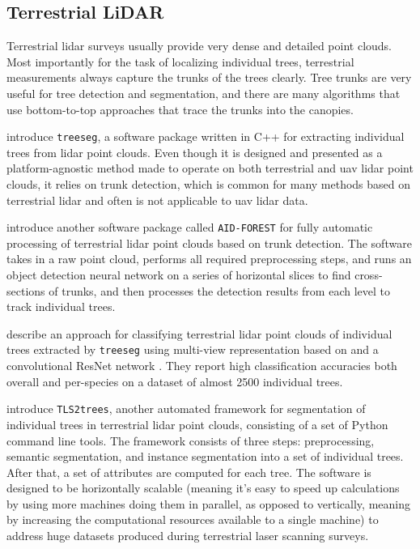 \subsection{Terrestrial LiDAR}

Terrestrial \gls{lidar} surveys usually provide very dense and detailed point clouds.
Most importantly for the task of localizing individual trees, terrestrial measurements always capture the trunks of the trees clearly.
Tree trunks are very useful for tree detection and segmentation, and there are many algorithms that use bottom-to-top approaches that trace the trunks into the canopies.

\citet{burtExtractingIndividualTrees2018} introduce \texttt{treeseg}, a software package written in C++ for extracting individual trees from \gls{lidar} point clouds.
Even though it is designed and presented as a platform-agnostic method made to operate on both terrestrial and \gls{uav} \gls{lidar} point clouds, it relies on trunk detection, which is common for many methods based on terrestrial \gls{lidar} and often is not applicable to \gls{uav} \gls{lidar} data.

\citet{lopezserranoArtificialIntelligencebasedSoftware2022} introduce another software package called \texttt{AID-FOREST} for fully automatic processing of terrestrial \gls{lidar} point clouds based on trunk detection.
The software takes in a raw point cloud, performs all required preprocessing steps, and runs an object detection neural network on a series of horizontal slices to find cross-sections of trunks, and then processes the detection results from each level to track individual trees.

\citet{allenTreeSpeciesClassification2022} describe an approach for classifying terrestrial \gls{lidar} point clouds of individual trees extracted by \texttt{treeseg} using multi-view representation based on \citet{goyalRevisitingPointCloud2021} and a convolutional ResNet network \citep{heDeepResidualLearning2016}.
They report high classification accuracies both overall and per-species on a dataset of almost 2500 individual trees.

\citet{wilkesTLS2treesScalableTree2023} introduce \texttt{TLS2trees}, another automated framework for segmentation of individual trees in terrestrial \gls{lidar} point clouds, consisting of a set of Python command line tools.
The framework consists of three steps: preprocessing, semantic segmentation, and instance segmentation into a set of individual trees.
After that, a set of attributes are computed for each tree.
The software is designed to be horizontally scalable (meaning it's easy to speed up calculations by using more machines doing them in parallel, as opposed to vertically, meaning by increasing the computational resources available to a single machine) to address huge datasets produced during terrestrial laser scanning surveys.

